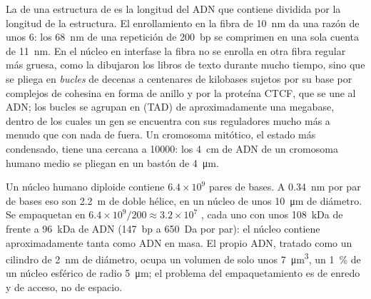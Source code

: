 \begin{proposition}\label{prop:b3:chromatin-epigenetics:compaction}
La \emph{} de una estructura de  es la
longitud del ADN que contiene dividida por la longitud de la estructura.
El enrollamiento en la fibra de \qty{10}{nm} da una razón de unos $6$:
los \qty{68}{nm} de una repetición de \qty{200}{bp} se comprimen en una
sola cuenta de \qty{11}{nm}. En el núcleo en interfase la fibra no se
enrolla en otra fibra regular más gruesa, como la dibujaron los libros de
texto durante mucho tiempo, sino que se pliega en \emph{bucles} de
decenas a centenares de kilobases sujetos por su base por complejos de
cohesina en forma de anillo y por la proteína CTCF, que se une al ADN;
los bucles se agrupan en \emph{} (TAD)
de aproximadamente una megabase, dentro de los cuales un gen se encuentra
con sus reguladores mucho más a menudo que con nada de fuera. Un
cromosoma mitótico, el estado más condensado, tiene una  cercana a \num{10000}: los \qty{4}{cm} de ADN de un
cromosoma humano medio se pliegan en un bastón de \qty{4}{\micro m}.
\end{proposition}

\begin{example}\label{ex:b3:chromatin-epigenetics:two-metres}
Un núcleo humano diploide contiene $6.4\times 10^{9}$ pares de bases. A
\qty{0.34}{nm} por par de bases eso son \qty{2.2}{m} de doble hélice, en
un núcleo de unos \qty{10}{\micro m} de diámetro. Se empaquetan en
$6.4\times 10^{9}/200 \approx 3.2\times 10^{7}$ , cada uno con
unos \qty{108}{kDa} de  frente a \qty{96}{kDa} de ADN
(\qty{147}{bp} a \qty{650}{Da} por par): el núcleo contiene
aproximadamente tanta  como ADN en masa. El propio ADN, tratado
como un cilindro de \qty{2}{nm} de diámetro, ocupa un volumen de solo
unos \qty{7}{\micro m^3}, un \qty{1}{\%} de un núcleo esférico de radio
\qty{5}{\micro m}; el problema del empaquetamiento es de enredo y de
acceso, no de espacio.
\end{example}

